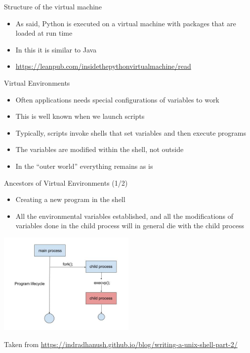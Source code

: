 \documentclass{beamer}
\begin{document}
\begin{frame}
{\centerline{Structure of the virtual machine}}
\begin{itemize}
    \item As said, Python is executed on a virtual machine with packages that are loaded at run time
    \item In this it is similar to Java
    \item \url{https://leanpub.com/insidethepythonvirtualmachine/read}
\end{itemize} 
\end{frame}




\begin{frame}
{\centerline{Virtual Environments}}
\begin{itemize}
    \item Often applications needs special configurations of variables to work
    \item This is well known when we launch scripts
    \item Typically, scripts invoke shells that set variables and then execute programs
    \item The variables are modified within the shell, not outside
    \item In the ``outer world'' everything remains as is
\end{itemize} 
\end{frame}

\begin{frame}
{\centerline{Ancestors of Virtual Environments (1/2)}}
\begin{itemize}
    \item Creating a new program in the shell
    \item All the environmental variables established, and all the modifications of variables done in the child process will in general die with the child process
\end{itemize} 
\begin{center}
    \includegraphics[width=0.5\textwidth]{Coding/execvp.jpg}
\end{center}

\begin{center}
    \tiny{Taken from \url{https://indradhanush.github.io/blog/writing-a-unix-shell-part-2/}}
\end{center}


\end{frame}
\end{document}
